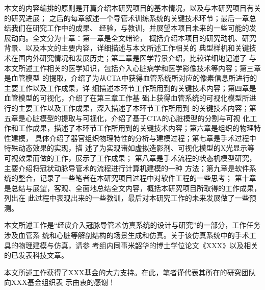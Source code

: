 本文的内容编排的原则是开篇介绍本研究项目的基本情况，以及与本研究项目有关的研究进展；
之后的每章叙述一个导管术训练系统的关键技术环节；最后一章总结我们在研究工作中的成果、
经验，与教训，并展望本项目未来的一些可能的发展动向。全文分为十章：第一章是全文绪论，
概括介绍本项目的研究动机、研究背景、以及本文的主要内容，详细描述与本文所述工作相关的
典型样机和关键技术在国内外研究情况和发展历史；第二章是医学背景介绍，比较详细地记述了
与本文所述工作相关的医学知识，包括介入心脏病学和医学影像技术等内容；第三章是血管模型
的提取，介绍了为从CTA中获得血管系统所对应的像素信息所进行的主要工作以及工作成果，详
细描述本环节工作所用到的关键技术内容；第四章是血管模型的可视化，介绍了在第三章工作基
础上获得血管系统的可视化模型所进行的主要工作以及工作成果，深入描述了本环节工作所用到
的关键技术内容；第五章是心脏模型的提取与可视化，介绍了基于CTA的心脏模型的分割与可视
化工作和工作成果，描述了本环节工作所用到的关键技术内容；第六章是组织的物理特性建模，
具体介绍了器官组织物理特性的分析与建模过程；第七章是手术过程中特殊动态效果的实现，描
述了为实现诸如虚拟造影剂、可视化模型的X光显示等可视效果而做的工作，展示了工作成果；
第八章是手术流程的状态机模型研究，主要介绍将冠状动脉导管术的流程进行计算机建模的一种
方法；第九章是软件系统的整合，记录了一些笔者在本研究项目过程中对软件工程的一些思考；
第十章是总结与展望，客观、全面地总结全文内容，概括本研究项目所取得的工作成果，列出在
此过程中表现出来的一些教训，最后对本研究工作的未来发展做了一些预测。

本文所述工作是“经皮介入冠脉导管术仿真系统的设计与研究”的一部分，工作任务涉及血管系
统和心脏等解剖结构的场景生成和仿真。关于该仿真系统中的手术工具的物理建模与仿真，请参
考组内同事米韶华的博士学位论文《XXX》以及相关的已发表科技文章。

本文所述工作获得了XXX基金的大力支持。在此，笔者谨代表其所在的研究团队向XXX基金组织表
示由衷的感谢！ 